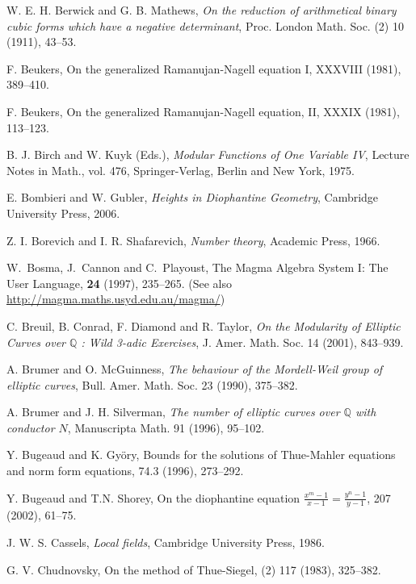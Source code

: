 \begin{thebibliography}{}
W. E. H. Berwick and G. B. Mathews,
\emph{On the reduction of arithmetical binary cubic forms which have a negative determinant},
Proc. London Math. Soc. (2) 10 (1911), 43--53.

F. Beukers,
\newblock On the generalized Ramanujan-Nagell equation I,
 XXXVIII (1981), 389--410.

F. Beukers,
\newblock On the generalized Ramanujan-Nagell equation, II,
 XXXIX (1981), 113--123.

B. J. Birch and W. Kuyk (Eds.),
\emph{Modular Functions of One Variable IV},
Lecture Notes in Math., vol. 476, Springer-Verlag, Berlin and New York, 1975.

E. Bombieri and W. Gubler,
\emph{Heights in Diophantine Geometry}, 
Cambridge University Press, 2006.

Z. I. Borevich and I. R. Shafarevich, \emph{Number theory},
Academic Press, 1966.

W.\ Bosma, J.\ Cannon and C.\ Playoust,
\newblock The Magma Algebra System I: The User Language,
 {\bf 24} (1997), 235--265. (See also \url{http://magma.maths.usyd.edu.au/magma/})

C. Breuil, B. Conrad, F. Diamond and R. Taylor,
\emph{On the Modularity of Elliptic Curves over $\mathbb{Q}$ : Wild 3-adic Exercises},
J. Amer. Math. Soc. 14 (2001), 843--939.

A. Brumer and O. McGuinness,
\emph{The behaviour of the Mordell-Weil group of elliptic curves},
Bull. Amer. Math. Soc. 23 (1990), 375--382.

A. Brumer and J. H. Silverman,
\emph{The number of elliptic curves over $\mathbb{Q}$ with conductor $N$},
Manuscripta Math. 91 (1996), 95--102.

Y. Bugeaud and K. Gy\"{o}ry, 
\newblock Bounds for the solutions of Thue-Mahler equations and norm form equations, 
 74.3 (1996), 273--292.

Y. Bugeaud and T.N. Shorey,
\newblock On the diophantine equation $\frac{x^m-1}{x-1} = \frac{y^n-1}{y-1}$,
  207 (2002), 61--75.

J. W. S. Cassels, \emph{Local fields},
Cambridge University Press, 1986.

G. V. Chudnovsky, 
\newblock On the method of Thue-Siegel, 
 (2) 117 (1983), 325--382. 


\end{thebibliography}

